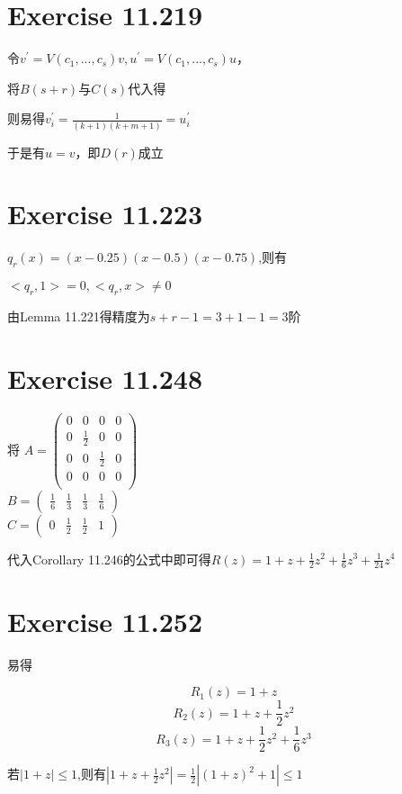 \documentclass[twoside,a4paper]{article}
\begin{document}
   \section{Exercise 11.219}

   令$v^{'}=V(c_1,...,c_s)v,u^{'}=V(c_1,...,c_s)u$，

   将$B(s+r)$与$C(s)$代入得

   则易得$v^{'}_i=\frac{1}{(k+1)(k+m+1)}=u^{'}_i$

   于是有$u=v$，即$D(r)$成立

 \section{Exercise 11.223}

 $q_r(x)=(x-0.25)(x-0.5)(x-0.75)$,则有

 $<q_r,1>=0,<q_r,x>\neq0$

 由Lemma 11.221得精度为$s + r − 1=3+1-1=3$阶

 
 \section{Exercise 11.248}

 将
 $A=\begin{pmatrix}
    0&0&0&0\\
    0&\frac{1}{2}&0&0\\
    0&0&\frac{1}{2}&0\\
    0&0&0&0\\
    \end{pmatrix}$\\
   $B=\begin{pmatrix}
    \frac{1}{6} & \frac{1}{3} &\frac{1}{3} &\frac{1}{6}
   \end{pmatrix}$\\
   $C=\begin{pmatrix}
    0 &\frac{1}{2}&\frac{1}{2}&1
   \end{pmatrix}$

   代入Corollary 11.246的公式中即可得$R(z)=1+z+\frac{1}{2}z^2+\frac{1}{6}z^3+\frac{1}{24}z^4$

 \section{Exercise 11.252}
 易得

 $$R_1(z)=1+z$$
 $$R_2(z)=1+z+\frac{1}{2}z^2$$
 $$R_3(z)=1+z+\frac{1}{2}z^2+\frac{1}{6}z^3$$
 
 若$|1+z|\le 1$,则有$|1+z+\frac{1}{2}z^2|=\frac{1}{2}|(1+z)^2+1|\le 1$
\end{document}
